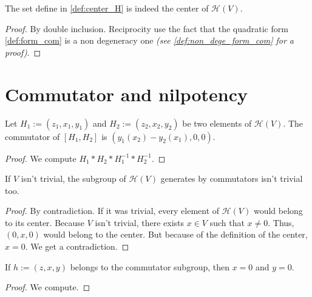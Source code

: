 \begin{proposition}
    \label{prop:center_H_is_center}
    \leanok

    The set define in \ref{def:center_H} is indeed the center of $\mathcal{H}(V)$.
\end{proposition}
\begin{proof}
    \leanok
    By double inclusion. Reciprocity use the fact that the quadratic form \ref{def:form_com}
    is a non degeneracy one \textit{(see \ref{def:non_dege_form_com} for a proof)}.
\end{proof}

\section{Commutator and nilpotency}

\begin{proposition}[Commutator]
    \label{prop:commutator_H_of_elements}
    \leanok 

    Let $H_1:=(z_1,x_1,y_1)$ and $H_2:=(z_2,x_2,y_2)$ be two elements of 
    $\mathcal{H}(V)$. The commutator of $[H_1,H_2]$ is $(y_1(x_2)-y_2(x_1),0,0)$.
\end{proposition}
\begin{proof}
    \leanok
    We compute $H_1*H_2*H_1^{-1}*H_2^{-1}$.
\end{proof}

\begin{proposition}
    \label{prop:commutator_H_nontrivial}
    \leanok 

    If $V$ isn't trivial, the subgroup of $\mathcal{H}(V)$ 
    generates by commutators isn't trivial too.
\end{proposition}
\begin{proof}
    \leanok 
    By contradiction. If it was trivial, every element of $\mathcal{H}(V)$
    would belong to its center.
    Because $V$ isn't trivial, there exists $x\in V$ such that $x\ne0$. Thus,
    $(0,x,0)$ would belong to the center. But because of the definition of the center, $x = 0$. 
    We get a contradiction.
\end{proof}

\begin{proposition}
        \label{prop:commutator_H_caracterisation}
        \leanok
    
        If $h:=(z,x,y)$ belongs to the commutator subgroup, then $x=0$ and $y=0$.
\end{proposition}
\begin{proof}
    \leanok
    We compute.
\end{proof}

